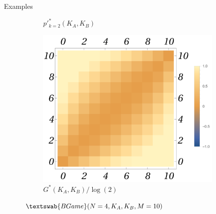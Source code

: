 \documentclass{beamer}
\theoremstyle{definition}
\newcommand{\BG}[1]{$\textswab{BGame}(#1)$}
\begin{document}
\begin{frame}[shrink=15]{Examples}
\begin{figure}[H]
\begin{subfigure}[b]{0.3\textwidth}
        \caption{\small \centering $p'^*_{k=2}(K_A,K_B)$}
        \label{fig:BGame4__10_ppk_2}
    \end{subfigure}
    \hfill %
    \begin{subfigure}[b]{0.3\textwidth}
        \includegraphics[width=\textwidth]{img/GB_Plot_4_10.png}
        \caption{\small \centering $G^*(K_A,K_B)/\log(2)$}
        \label{fig:BGame4__10_G}
    \end{subfigure}
    
    \caption{\small \centering \BG{N=4,K_A,K_B,M=10}}
    \label{fig:BGame4__10_PppkG}
\end{figure}
\end{frame}
\end{document}
